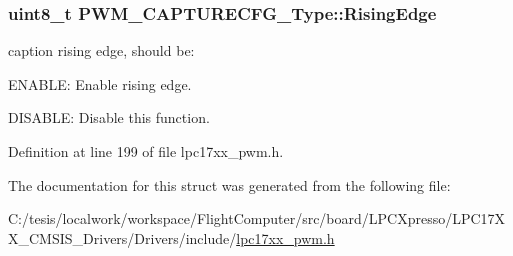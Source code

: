\hypertarget{struct_p_w_m___c_a_p_t_u_r_e_c_f_g___type_ad10b8ea8b8787126461930fc818ffd50}{
\subsubsection[{\-Rising\-Edge}]{\setlength{\rightskip}{0pt plus 5cm}uint8\-\_\-t {\bf \-P\-W\-M\-\_\-\-C\-A\-P\-T\-U\-R\-E\-C\-F\-G\-\_\-\-Type\-::\-Rising\-Edge}}}\label{struct_p_w_m___c_a_p_t_u_r_e_c_f_g___type_ad10b8ea8b8787126461930fc818ffd50}
caption rising edge, should be\-:
\begin{DoxyItemize}
\item \-E\-N\-A\-B\-L\-E\-: \-Enable rising edge.
\item \-D\-I\-S\-A\-B\-L\-E\-: \-Disable this function. 
\end{DoxyItemize}

\-Definition at line 199 of file lpc17xx\-\_\-pwm.\-h.



\-The documentation for this struct was generated from the following file\-:\begin{DoxyCompactItemize}
\item 
\-C\-:/tesis/localwork/workspace/\-Flight\-Computer/src/board/\-L\-P\-C\-Xpresso/\-L\-P\-C17\-X\-X\-\_\-\-C\-M\-S\-I\-S\-\_\-\-Drivers/\-Drivers/include/\hyperlink{lpc17xx__pwm_8h}{lpc17xx\-\_\-pwm.\-h}\end{DoxyCompactItemize}
